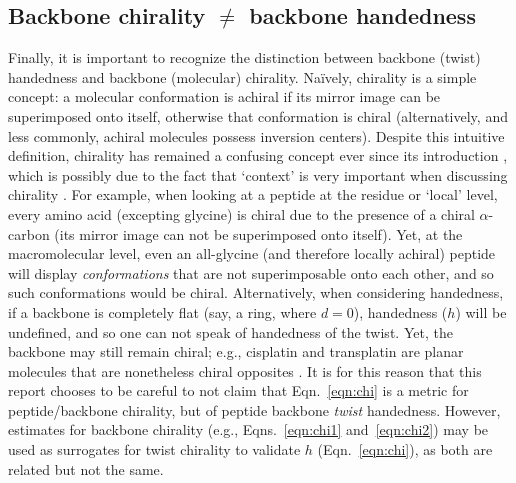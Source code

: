 \documentclass[fleqn,10pt,lineno]{wlpeerj} %
\newcommand{\n}[1]{{\color{blue}#1}}
\newcommand{\Eqn}[1]{Eqn.~\ref{#1}}
\newcommand{\Eqns}[1]{Eqns.~\ref{#1}}
\newcommand{\h}{h}
\begin{document}
\subsection*{\n{Backbone chirality $\bm\neq$ backbone handedness}}
\n{Finally, it is important to recognize the distinction between backbone (twist) handedness and backbone (molecular) chirality. Na{\"i}vely, chirality is a simple concept: a molecular conformation is achiral if its mirror image can be superimposed onto itself, otherwise that conformation is chiral \citep{Gold1997} (alternatively, and less commonly, achiral molecules possess inversion centers). Despite this intuitive definition, chirality has remained a confusing concept ever since its introduction \citep{Bentley2010,Wallentin2009}, which is possibly due to the fact that `context' is very important when discussing chirality \citep{Mislow2002}. For example, when looking at a peptide at the residue or `local' level, every amino acid (excepting glycine) is chiral due to the presence of a chiral $\alpha$-carbon (its mirror image can not be superimposed onto itself). Yet, at the macromolecular level, even an all-glycine (and therefore locally achiral) peptide will display {\em conformations} that are not superimposable onto each other, and so such conformations would be chiral. Alternatively, when considering handedness, if a backbone is completely flat (say, a ring, where $d=0$), handedness ($h$) will be undefined, and so one can not speak of handedness of the twist. Yet, the backbone may still remain chiral; e.g., cisplatin and transplatin are planar molecules that are nonetheless chiral opposites \citep{Testa2013}. It is for this reason that this report chooses to be careful to not claim that \Eqn{eqn:chi} is a metric for peptide/backbone chirality, but of peptide backbone {\em twist} handedness. However, estimates for backbone chirality (e.g., \Eqns{eqn:chi1} and~\ref{eqn:chi2}) may be used as surrogates for twist chirality to validate $\h$ (\Eqn{eqn:chi}), as both are related but not the same.}
\end{document}
